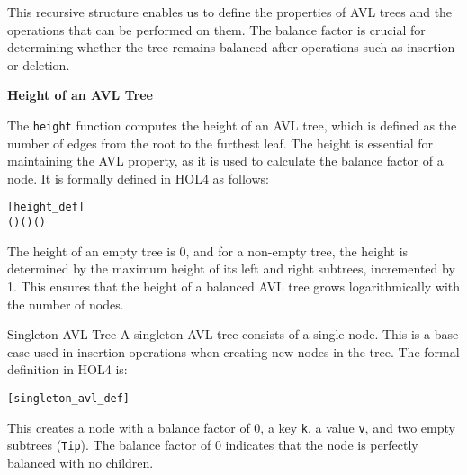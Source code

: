 This recursive structure enables us to define the properties of AVL trees and the operations that can be performed on them. The balance factor is crucial for determining whether the tree remains balanced after operations such as insertion or deletion.

\textbf{Height of an AVL Tree}

The \texttt{height} function computes the height of an AVL tree, which is defined as the number of edges from the root to the furthest leaf. The height is essential for maintaining the AVL property, as it is used to calculate the balance factor of a node. It is formally defined in HOL4 as follows:

\begin{alltt}
	[height_def]
	  \HOLTokenDefEquality{} 
 (     ) \HOLTokenDefEquality{}  ( ) ( ) \HOLSymConst{\ensuremath{+}} 
\end{alltt}


The height of an empty tree is 0, and for a non-empty tree, the height is determined by the maximum height of its left and right subtrees, incremented by 1. This ensures that the height of a balanced AVL tree grows logarithmically with the number of nodes.


\begin{defn}{Singleton AVL Tree}
A singleton AVL tree consists of a single node. This is a base case used in insertion operations when creating new nodes in the tree. The formal definition in HOL4 is:

\begin{alltt}
	[singleton_avl_def]
	   \HOLTokenDefEquality{}      
\end{alltt}



This creates a node with a balance factor of 0, a key \texttt{k}, a value \texttt{v}, and two empty subtrees (\texttt{Tip}). The balance factor of 0 indicates that the node is perfectly balanced with no children.
\end{defn}



